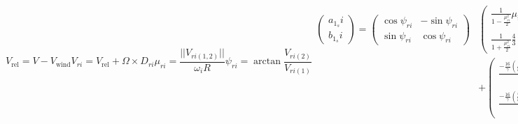     \begin{subequations}
        \label{eq:observer:flapping}
        \begin{equation}
            V_{\text{rel}} = V - V_{\text{wind}}
        \end{equation}
        \begin{equation}
            V_{ri} = V_{\text{rel}} + \Omega \times D_{ri} %
        \end{equation}
        \begin{equation}
            \mu_{ri} = \frac{||V_{ri(1,2)}||}{\omega_{i}R}
        \end{equation}
        \begin{equation}
            \psi_{ri} = \arctan{\frac{V_{ri(2)}}{V_{ri(1)}}}
        \end{equation}
        \begin{equation}
            \label{eq:observer:flapping:ab}
            \begin{array}{rr}\left(
                \begin{array}{c}
                    a_{1_{s}}i \\
                    b_{1_{s}}i
                \end{array} \right)
                = \left(
                \begin{array}{cc}
                    \cos{\psi_{ri}} & -\sin{\psi_{ri}} \\
                    \sin{\psi_{ri}} & \cos{\psi_{ri}}
                \end{array}
                \right) & \left(
                    \begin{array}{c}
                        \frac{1}{1 - \frac{\mu_{ri}^{2}}{2}}\mu_{ri}\left( 4 \theta_{twist} - 2\lambda_{i}\right) \\
                        \frac{1}{1 + \frac{\mu_{ri}^{2}}{2}}\frac{4}{3}\left( \frac{C_{T}}{\sigma}\frac{2}{3}\frac{\mu_{ri}\gamma}{a} + \mu_{ri}\right)
                    \end{array}
                \right) \\
                & +
                \left(
                    \begin{array}{c}
                        \frac{-\frac{16}{\gamma}\left(\frac{\omega_{\theta}}{\omega_{ri}}\right) + \left(\frac{\omega_{\psi}}{\omega_{ri}}\right)}{1 - \frac{\mu_{ri}^{2}}{2}} \\
                        \frac{-\frac{16}{\gamma}\left(\frac{\omega_{\psi}}{\omega_{ri}}\right) + \left(\frac{\omega_{\theta}}{\omega_{ri}}\right)}{1 + \frac{\mu_{ri}^{2}}{2}}
                    \end{array}
                \right)
            \end{array}
        \end{equation}


\end{subequations}
